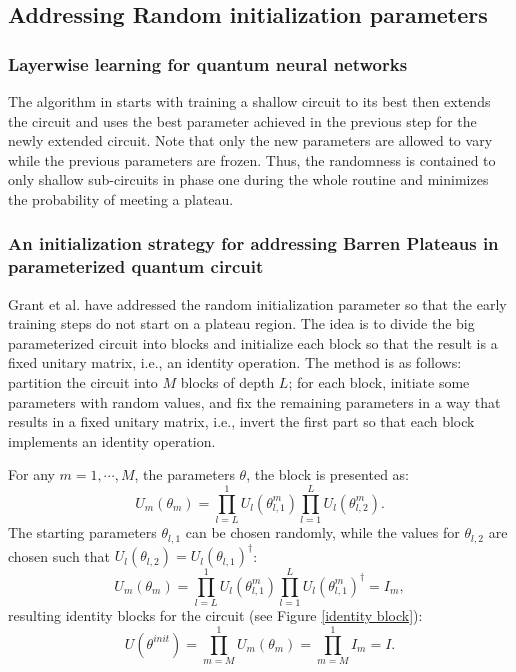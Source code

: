 \subsection{Addressing Random initialization parameters}

\subsubsection{Layerwise learning for quantum neural networks}
The algorithm in \cite{skolikLayerwiseLearningQuantum2021} starts with training a shallow circuit to its best then extends the circuit and uses the best parameter achieved in the previous step for the newly extended circuit. 
Note that only the new parameters are allowed to vary while the previous parameters are frozen.
Thus, the randomness is contained to only shallow sub-circuits in phase one during the whole routine and minimizes the probability of meeting a plateau.


\subsubsection{An initialization strategy for addressing Barren Plateaus in parameterized quantum circuit}

Grant et al. \cite{grantInitializationStrategyAddressing2019} have addressed the random initialization parameter so that the early training steps do not start on a plateau region. 
The idea is to divide the big parameterized circuit into blocks and initialize each block so that the result is a fixed unitary matrix, i.e., an identity operation. 
The method is as follows: partition the circuit into $M$ blocks of depth $L$; for each block, initiate some parameters with random values, and fix the remaining parameters in a way that results in a fixed unitary matrix, i.e., invert the first part so that each block implements an identity operation.

For any $m = 1, \cdots, M$, the parameters $\theta$, the block is presented as:
\begin{equation}
    U_m(\theta_m)
    = \prod_{l=L}^1 U_l(\theta_{l,1}^m) \prod_{l=1}^L U_l(\theta_{l,2}^m).
\end{equation}
The starting parameters $\theta_{l,1}$ can be chosen randomly, while the values for $\theta_{l,2}$ are chosen such that $U_l(\theta_{l,2}) = U_l(\theta_{l,1})^\dagger$:
\begin{equation}
    U_m(\theta_m)
    = \prod_{l=L}^1 U_l(\theta_{l,1}^m)
    \prod_{l=1}^L U_l(\theta_{l,1}^m)^\dagger
    = I_m,
\end{equation}
resulting identity blocks for the circuit (see Figure \ref{identity block}):
\begin{equation}
    U(\theta^{init})
    = \prod_{m=M}^1 U_m(\theta_m)
    = \prod_{m=M}^1 I_m
    = I.
\end{equation}

